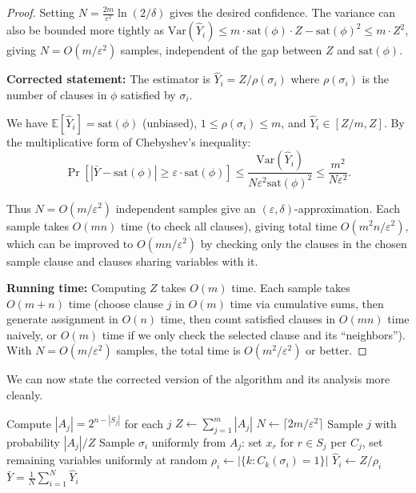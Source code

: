 \documentclass[twoside,12pt]{book}
\theoremstyle{plain}
\theoremstyle{definition}
\theoremstyle{remark}
\begin{document}
\begin{proof}
Setting $N = \frac{2m}{\varepsilon^2} \ln(2/\delta)$ gives the desired confidence. The variance can also be bounded more tightly as $\mathrm{Var}(\hat{Y}_i) \leq m \cdot \text{sat}(\phi) \cdot Z - \text{sat}(\phi)^2 \leq m \cdot Z^2$, giving $N = O(m/\varepsilon^2)$ samples, independent of the gap between $Z$ and $\text{sat}(\phi)$.

\textbf{Corrected statement:} The estimator is $\hat{Y}_i = Z / \rho(\sigma_i)$ where $\rho(\sigma_i)$ is the number of clauses in $\phi$ satisfied by $\sigma_i$.

We have $\mathbb{E}[\hat{Y}_i] = \text{sat}(\phi)$ (unbiased), $1 \leq \rho(\sigma_i) \leq m$, and $\hat{Y}_i \in [Z/m, Z]$. By the multiplicative form of Chebyshev's inequality:
\[
\Pr\!\left[\left|\bar{Y} - \text{sat}(\phi)\right| \geq \varepsilon \cdot \text{sat}(\phi)\right] \leq \frac{\mathrm{Var}(\hat{Y}_i)}{N \varepsilon^2 \text{sat}(\phi)^2} \leq \frac{m^2}{N \varepsilon^2}.
\]

Thus $N = O(m/\varepsilon^2)$ independent samples give an $(\varepsilon, \delta)$-approximation. Each sample takes $O(mn)$ time (to check all clauses), giving total time $O(m^2 n / \varepsilon^2)$, which can be improved to $O(mn/\varepsilon^2)$ by checking only the clauses in the chosen sample clause and clauses sharing variables with it.

\textbf{Running time:} Computing $Z$ takes $O(m)$ time. Each sample takes $O(m + n)$ time (choose clause $j$ in $O(m)$ time via cumulative sums, then generate assignment in $O(n)$ time, then count satisfied clauses in $O(mn)$ time naively, or $O(m)$ time if we only check the selected clause and its ``neighbors''). With $N = O(m/\varepsilon^2)$ samples, the total time is $O(m^2/\varepsilon^2)$ or better.
\end{proof}

We can now state the corrected version of the algorithm and its analysis more cleanly.

\begin{algorithm}
\caption{Karp--Luby DNF Counting (Corrected)}
\label{alg:karpluby-correct}
\begin{algorithmic}[1]
    \State Compute $|A_j| = 2^{n - |S_j|}$ for each $j$
    \State $Z \gets \sum_{j=1}^m |A_j|$
    \State $N \gets \lceil 2m / \varepsilon^2 \rceil$
        \State Sample $j$ with probability $|A_j|/Z$
        \State Sample $\sigma_i$ uniformly from $A_j$: set $x_r$ for $r \in S_j$ per $C_j$, set remaining variables uniformly at random
        \State $\rho_i \gets |\{k : C_k(\sigma_i) = 1\}|$ 
        \State $\hat{Y}_i \gets Z / \rho_i$
    \EndFor
    \State \Return $\bar{Y} = \frac{1}{N} \sum_{i=1}^N \hat{Y}_i$
\EndFunction
\end{algorithmic}
\end{algorithm}
\end{document}
